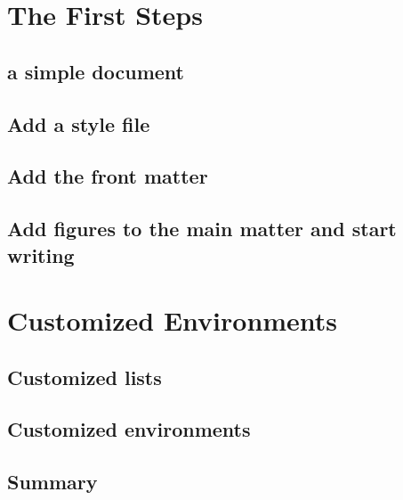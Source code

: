 \documentclass[12pt,letterpaper,oneside]{book}
\begin{document}
\frontmatter
	\flyleaf                        
	\disclaimerpage                 
	\titlepageAFIT                      
	\committeepage  
	
	\tableofcontents
	\listoffigures
	
\mainmatter
	
	\chapter{The First Steps}
		
		
		\figMyFirstLaTeX
		\section{\Latex a simple document}
		
		\figafitStyle

		\section{Add a style file}
		
		
		\figtitlePage
		\section{Add the front matter}
		

		\figmyFlypage
		
		\figmyFirstAbstract
		

		\section{Add figures to the main matter and start writing}
		\figmyFigures
		
				\figmyFirstFigures
		
		
	\chapter{Customized Environments}
		
		\section{Customized lists}
		
		\section{Customized environments}
		
		\section{Summary}
		
\end{document}
